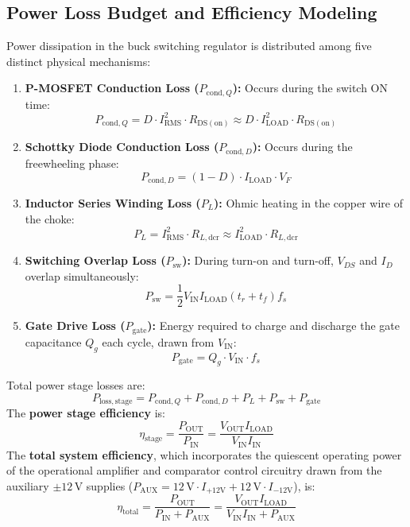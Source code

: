 \documentclass[12pt,a4paper]{article}
\newcommand{\Vout}{V_{\mathrm{OUT}}}
\newcommand{\Vin}{V_{\mathrm{IN}}}
\newcommand{\Iload}{I_{\mathrm{LOAD}}}
\newcommand{\Iin}{I_{\mathrm{IN}}}
\newcommand{\Pin}{P_{\mathrm{IN}}}
\newcommand{\Pout}{P_{\mathrm{OUT}}}
\newcommand{\fs}{f_s}
\newcommand{\Rdson}{R_{\mathrm{DS(on)}}}
\newcommand{\DCR}{R_{L,\mathrm{dcr}}}
\begin{document}
\subsection{Power Loss Budget and Efficiency Modeling}
Power dissipation in the buck switching regulator is distributed among five distinct physical mechanisms:
\begin{enumerate}[leftmargin=1.5em]
    \item \textbf{P-MOSFET Conduction Loss ($P_{\mathrm{cond},Q}$):} Occurs during the switch ON time:
    \begin{equation}
        P_{\mathrm{cond},Q} = D \cdot I_{\mathrm{RMS}}^2 \cdot \Rdson \approx D \cdot \Iload^2 \cdot \Rdson
    \end{equation}
    \item \textbf{Schottky Diode Conduction Loss ($P_{\mathrm{cond},D}$):} Occurs during the freewheeling phase:
    \begin{equation}
        P_{\mathrm{cond},D} = (1 - D) \cdot \Iload \cdot V_F
    \end{equation}
    \item \textbf{Inductor Series Winding Loss ($P_{L}$):} Ohmic heating in the copper wire of the choke:
    \begin{equation}
        P_{L} = I_{\mathrm{RMS}}^2 \cdot \DCR \approx \Iload^2 \cdot \DCR
    \end{equation}
    \item \textbf{Switching Overlap Loss ($P_{\mathrm{sw}}$):} During turn-on and turn-off, $V_{DS}$ and $I_D$ overlap simultaneously:
    \begin{equation}
        P_{\mathrm{sw}} = \frac{1}{2} \Vin \Iload (t_r + t_f) \fs
    \end{equation}
    \item \textbf{Gate Drive Loss ($P_{\mathrm{gate}}$):} Energy required to charge and discharge the gate capacitance $Q_g$ each cycle, drawn from $\Vin$:
    \begin{equation}
        P_{\mathrm{gate}} = Q_g \cdot \Vin \cdot \fs
    \end{equation}
\end{enumerate}
Total power stage losses are:
\begin{equation}
    P_{\mathrm{loss,stage}} = P_{\mathrm{cond},Q} + P_{\mathrm{cond},D} + P_{L} + P_{\mathrm{sw}} + P_{\mathrm{gate}}
\end{equation}
The \textbf{power stage efficiency} is:
\begin{equation}
    \eta_{\mathrm{stage}} = \frac{\Pout}{\Pin} = \frac{\Vout \Iload}{\Vin \Iin}
\end{equation}
The \textbf{total system efficiency}, which incorporates the quiescent operating power of the operational amplifier and comparator control circuitry drawn from the auxiliary $\pm12\,\mathrm{V}$ supplies ($P_{\mathrm{AUX}} = 12\,\mathrm{V} \cdot I_{+12\mathrm{V}} + 12\,\mathrm{V} \cdot I_{-12\mathrm{V}}$), is:
\begin{equation}
    \eta_{\mathrm{total}} = \frac{\Pout}{\Pin + P_{\mathrm{AUX}}} = \frac{\Vout \Iload}{\Vin \Iin + P_{\mathrm{AUX}}}
\end{equation}
\end{document}
